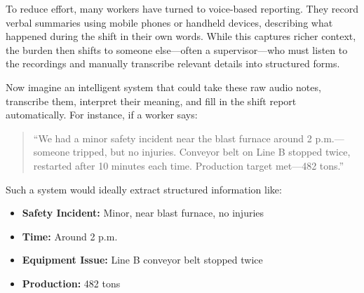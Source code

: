 To reduce effort, many workers have turned to voice-based reporting. They record verbal summaries using mobile phones or handheld devices, describing what happened during the shift in their own words. While this captures richer context, the burden then shifts to someone else—often a supervisor—who must listen to the recordings and manually transcribe relevant details into structured forms.

Now imagine an intelligent system that could take these raw audio notes, transcribe them, interpret their meaning, and fill in the shift report automatically. For instance, if a worker says:

\begin{quote}
``We had a minor safety incident near the blast furnace around 2 p.m.—someone tripped, but no injuries. Conveyor belt on Line B stopped twice, restarted after 10 minutes each time. Production target met—482 tons.''
\end{quote}

Such a system would ideally extract structured information like:
\begin{itemize}
    \item \textbf{Safety Incident:} Minor, near blast furnace, no injuries
    \item \textbf{Time:} Around 2 p.m.
    \item \textbf{Equipment Issue:} Line B conveyor belt stopped twice
    \item \textbf{Production:} 482 tons
\end{itemize}

